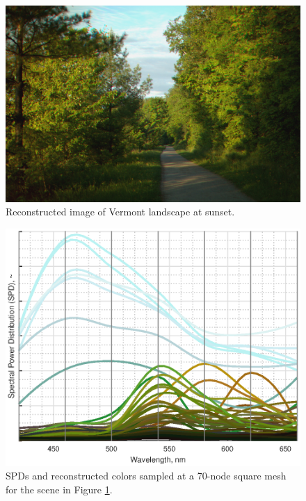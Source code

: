 \documentclass[twocolumn,10pt]{asme2ej}
\begin{document}
\begin{figure}[H]
\begin{centering}
  \includegraphics[height=0.55\linewidth]{vermont_path.jpg}
  \caption{Reconstructed image of Vermont landscape at sunset.}
  \label{path_mesh}
  \end{centering}
\end{figure}

\begin{figure}[H]
\begin{centering}
  \includegraphics[height=0.6\linewidth]{vermont_path.eps}
  \caption{SPDs and reconstructed colors sampled at a 70-node square mesh for the scene in Figure \ref{path_mesh}.}
  \label{path_SPDs}
  \end{centering}
\end{figure}

\clearpage
\end{document}
